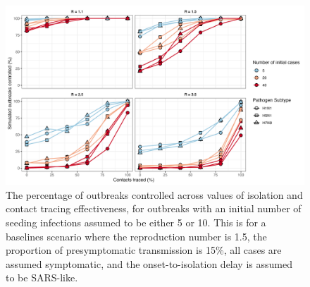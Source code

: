 \documentclass{article}
\begin{document}
\begin{figure}[ht]
\centering
\includegraphics[width=\textwidth]{../plots/prop_outbreak_control_num_init_cases.png}
\caption{The percentage of outbreaks controlled across values of isolation and contact tracing effectiveness, for outbreaks with an initial number of seeding infections assumed to be either 5 or 10. This is for a baselines scenario where the reproduction number is 1.5, the proportion of presymptomatic transmission is 15\%, all cases are assumed symptomatic, and the onset-to-isolation delay is assumed to be SARS-like.}
\label{fig:prop-outbreak-control-num-init-cases}
\end{figure}

\clearpage
\end{document}
